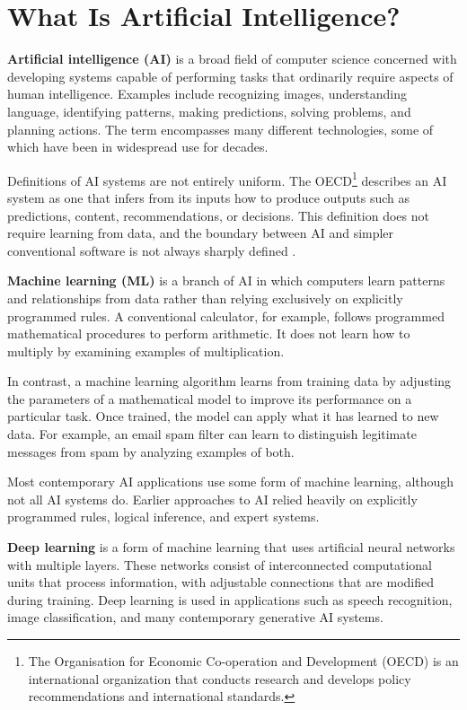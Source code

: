 \documentclass[11pt]{article}
\begin{document}
\section{What Is Artificial Intelligence?}

\textbf{Artificial intelligence (AI)} is a broad field of computer
science concerned with developing systems capable of performing tasks
that ordinarily require aspects of human intelligence. Examples include
recognizing images, understanding language, identifying patterns,
making predictions, solving problems, and planning actions. The term
encompasses many different technologies, some of which have been in
widespread use for decades.

Definitions of AI systems are not entirely uniform. The 
OECD\footnote{The Organisation for Economic Co-operation and
Development (OECD) is an international organization that conducts
research and develops policy recommendations and international
standards.}
describes an AI system as one that infers from its inputs how to produce outputs
such as predictions, content, recommendations, or decisions. This
definition does not require learning from data, and the boundary between
AI and simpler conventional software is not always sharply defined
\citep{OECD2024AIDefinition}.

\textbf{Machine learning (ML)}
is a branch of AI in which computers
learn patterns and relationships from data rather than relying
exclusively on explicitly programmed rules. A conventional
calculator, for example, follows programmed mathematical
procedures to perform arithmetic. It does not learn how to
multiply by examining examples of multiplication.

In contrast, a machine learning algorithm learns from training data by adjusting the parameters of a mathematical model to improve its performance on a particular task. Once trained, the model can apply what it has learned to new data. For example, an email spam filter can learn to distinguish legitimate messages from spam by analyzing examples of both.

Most contemporary AI applications use some form of machine learning,
although not all AI systems do. Earlier approaches to AI relied
heavily on explicitly programmed rules, logical inference, and
expert systems.

\textbf{Deep learning} is a form of machine learning that uses artificial neural networks with multiple layers. These networks consist of interconnected computational units that process information, with adjustable connections that are modified during training. Deep learning is used in applications such as speech recognition, image classification, and many contemporary generative AI systems.
\end{document}
